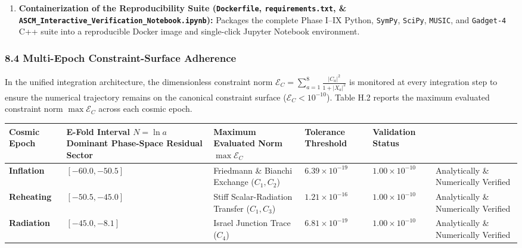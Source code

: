 \documentclass[aps,prd,onecolumn,superscriptaddress,nofootinbib,longbibliography,10pt]{revtex4-2}
\begin{document}
{{\begin{enumerate}
\item \textbf{Containerization of the Reproducibility Suite (\texttt{Dockerfile}, \texttt{requirements.txt}, \& \texttt{ASCM_Interactive_Verification_Notebook.ipynb}):} Packages the complete Phase I–IX Python, \texttt{SymPy}, \texttt{SciPy}, \texttt{MUSIC}, and \texttt{Gadget-4} C++ suite into a reproducible Docker image and single-click Jupyter Notebook environment.

\end{enumerate}




\subsubsection*{8.4 Multi-Epoch Constraint-Surface Adherence}

  In the unified integration architecture, the dimensionless constraint norm \(\mathcal{E}_C = \sum_{a=1}^8 \frac{|C_a|^2}{1 + |X_a|^2}\) is monitored at every integration step to ensure the numerical trajectory remains on the canonical constraint surface (\(\mathcal{E}_C < 10^{-10}\)). Table H.2 reports the maximum evaluated constraint norm \(\max\mathcal{E}_C\) across each cosmic epoch.



  
\begin{center}
\begin{tabular}{|llllll|}
\hline

      Cosmic Epoch & E-Fold Interval \(N = \ln a\)
        Dominant Phase-Space Residual Sector & Maximum Evaluated Norm \(\max\mathcal{E}_C\) & Tolerance Threshold & Validation Status
       \\ \hline

    
    
      \textbf{Inflation} & \([-60.0, -50.5]\) & Friedmann \& Bianchi Exchange (\(C_1, C_2\)) & \(6.39 \times 10^{-19}\) & \(1.00 \times 10^{-10}\) & Analytically \& Numerically Verified \\ \hline

      \textbf{Reheating} & \([-50.5, -45.0]\) & Stiff Scalar-Radiation Transfer (\(C_1, C_3\)) & \(1.21 \times 10^{-16}\) & \(1.00 \times 10^{-10}\) & Analytically \& Numerically Verified \\ \hline

      \textbf{Radiation} & \([-45.0, -8.1]\) & Israel Junction Trace (\(C_4\)) & \(6.81 \times 10^{-19}\) & \(1.00 \times 10^{-10}\) & Analytically \& Numerically Verified \\ \hline


\end{tabular}
\end{center}}}
\end{document}
